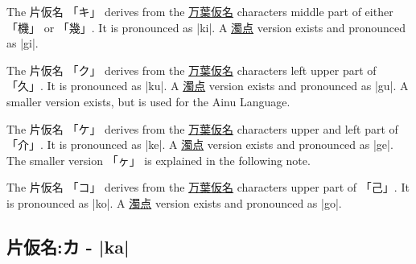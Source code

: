 \documentclass[paper=a4,headings=small,titlepage,makeidx,fontsize=12pt]{scrbook}
\begin{document}
 The 片仮名 {「キ」} derives from the
\hyperref[sec:Manyogana]{万葉仮名} characters middle part of either {「機」} or
{「幾」}.  It is pronounced as |ki|.  A \hyperref[sec:Dakuten]{濁点} version
exists and pronounced as |gi|.


 The 片仮名 {「ク」} derives from the
\hyperref[sec:Manyogana]{万葉仮名} characters left upper part of {「久」}.  It
is pronounced as |ku|.  A \hyperref[sec:Dakuten]{濁点} version exists and
pronounced as |gu|.  A smaller version exists, but is used for the Ainu
Language.



 The 片仮名 {「ケ」} derives from the
\hyperref[sec:Manyogana]{万葉仮名} characters upper and left part of {「介」}.
It is pronounced as |ke|.  A \hyperref[sec:Dakuten]{濁点} version exists and
pronounced as |ge|.  The smaller version {「ヶ」} is explained in the following note.

\newpage


 The 片仮名 {「コ」} derives from the
\hyperref[sec:Manyogana]{万葉仮名} characters upper part of {「己」}.  It is
pronounced as |ko|.  A \hyperref[sec:Dakuten]{濁点} version exists and
pronounced as |go|.



\newpage

\subsection{片仮名:カ - |ka|} \label{sec:KatakanaKa}

\end{document}
